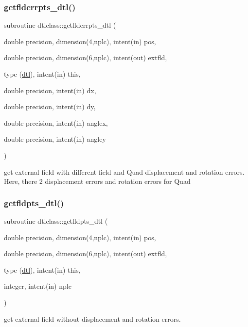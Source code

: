 \subsubsection{\texorpdfstring{getflderrpts\_dtl()}{getflderrpts\_dtl()}}
{\footnotesize\ttfamily subroutine dtlclass\+::getflderrpts\+\_\+dtl (\begin{DoxyParamCaption}\item[{double precision, dimension(4,nplc), intent(in)}]{pos,  }\item[{double precision, dimension(6,nplc), intent(out)}]{extfld,  }\item[{type (\mbox{\hyperlink{namespacedtlclass_structdtlclass_1_1dtl}{dtl}}), intent(in)}]{this,  }\item[{double precision, intent(in)}]{dx,  }\item[{double precision, intent(in)}]{dy,  }\item[{double precision, intent(in)}]{anglex,  }\item[{double precision, intent(in)}]{angley }\end{DoxyParamCaption})}



get external field with different field and Quad displacement and rotation errors. Here, there 2 displacement errors and rotation errors for Quad 

\mbox{\label{namespacedtlclass_ad87e70265bf1286abf4b2976d8ac37ac}} 
\subsubsection{\texorpdfstring{getfldpts\_dtl()}{getfldpts\_dtl()}}
{\footnotesize\ttfamily subroutine dtlclass\+::getfldpts\+\_\+dtl (\begin{DoxyParamCaption}\item[{double precision, dimension(4,nplc), intent(in)}]{pos,  }\item[{double precision, dimension(6,nplc), intent(out)}]{extfld,  }\item[{type (\mbox{\hyperlink{namespacedtlclass_structdtlclass_1_1dtl}{dtl}}), intent(in)}]{this,  }\item[{integer, intent(in)}]{nplc }\end{DoxyParamCaption})}



get external field without displacement and rotation errors. 

